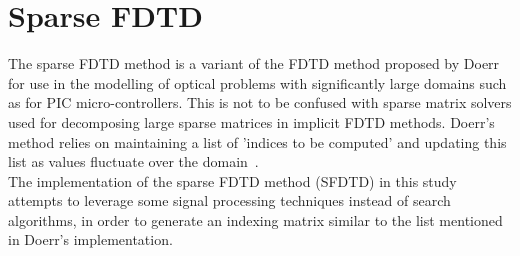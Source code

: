 %

\section{Sparse FDTD}
The sparse FDTD method is a variant of the FDTD method proposed by Doerr~\cite{Doerr} for use in the modelling of optical problems with significantly large domains such as for PIC micro-controllers. This is not to be confused with sparse matrix solvers used for decomposing large sparse matrices in implicit FDTD methods. Doerr's method relies on maintaining a list of 'indices to be computed' and updating this list as values fluctuate over the domain~\cite{Doerr2015}.\\

The implementation of the sparse FDTD method (SFDTD) in this study attempts to leverage some signal processing techniques instead of search algorithms, in order to generate an indexing matrix similar to the list mentioned in Doerr's implementation. 












